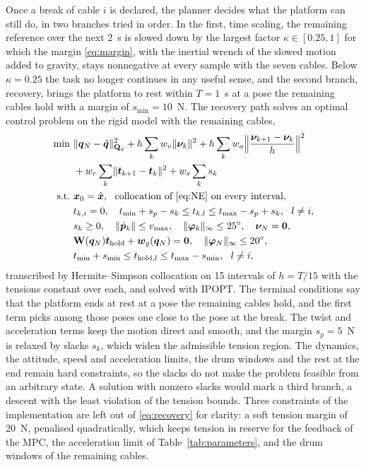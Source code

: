\documentclass{interact}
\newcommand{\vc}[1]{\bm{#1}}
\newcommand{\mt}[1]{\mathbf{#1}}
\begin{document}
Once a break of cable $i$ is declared, the planner decides what the platform can still do, in two branches tried in order. In the first, time scaling, the remaining reference over the next 2~s is slowed down by the largest factor $\kappa\in[0.25,1]$ for which the margin \eqref{eq:margin}, with the inertial wrench of the slowed motion added to gravity, stays nonnegative at every sample with the seven cables. Below $\kappa=0.25$ the task no longer continues in any useful sense, and the second branch, recovery, brings the platform to rest within $T=1$~s at a pose the remaining cables hold with a margin of $s_{\min}=10$~N. The recovery path solves an optimal control problem on the rigid model with the remaining cables,
\begin{equation}\label{eq:recovery}
\begin{aligned}
\min\ &\lVert\vc q_N-\hat{\vc q}\rVert^2_{\mt Q_q}+h\sum_k w_v\lVert\vc\nu_k\rVert^2+h\sum_k w_a\Big\lVert\frac{\vc\nu_{k+1}-\vc\nu_k}{h}\Big\rVert^2\\
&+w_r\sum_k\lVert\vc t_{k+1}-\vc t_k\rVert^2+w_s\sum_k s_k\\
\text{s.t.}\ &\vc x_0=\hat{\vc x},\ \ \text{collocation of \eqref{eq:NE} on every interval},\\
&t_{k,i}=0,\quad t_{\min}+s_p-s_k\le t_{k,l}\le t_{\max}-s_p+s_k,\ \ l\ne i,\\
&s_k\ge0,\quad\lVert\dot{\vc p}_k\rVert\le v_{\max},\quad\lVert\vc\varphi_k\rVert_\infty\le25^\circ,\quad\vc\nu_N=\vc0,\\
&\mt W(\vc q_N)\vc t_{\mathrm{hold}}+\vc w_g(\vc q_N)=\vc 0,\quad\lVert\vc\varphi_N\rVert_\infty\le20^\circ,\\
&t_{\min}+s_{\min}\le t_{\mathrm{hold},l}\le t_{\max}-s_{\min},\ \ l\ne i,
\end{aligned}
\end{equation}
transcribed by Hermite--Simpson collocation \citep{kelly2017collocation} on 15 intervals of $h=T/15$ with the tensions constant over each, and solved with IPOPT. The terminal conditions say that the platform ends at rest at a pose the remaining cables hold, and the first term picks among those poses one close to the pose at the break. The twist and acceleration terms keep the motion direct and smooth, and the margin $s_p=5$~N is relaxed by slacks $s_k$, which widen the admissible tension region. The dynamics, the attitude, speed and acceleration limits, the drum windows and the rest at the end remain hard constraints, so the slacks do not make the problem feasible from an arbitrary state. A solution with nonzero slacks would mark a third branch, a descent with the least violation of the tension bounds. Three constraints of the implementation are left out of \eqref{eq:recovery} for clarity: a soft tension margin of 20~N, penalised quadratically, which keeps tension in reserve for the feedback of the MPC, the acceleration limit of Table~\ref{tab:parameters}, and the drum windows of the remaining cables.
\end{document}
